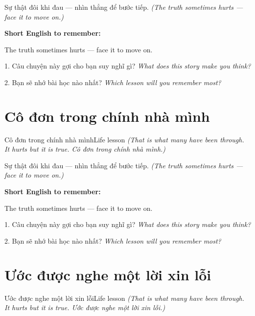 \begin{baihoc}
Sự thật đôi khi đau — nhìn thẳng để bước tiếp.
\textit{(The truth sometimes hurts — face it to move on.)}
\end{baihoc}

\begin{ghinhoanh}
\textbf{Short English to remember:}

The truth sometimes hurts — face it to move on.

\end{ghinhoanh}

\begin{tuhocnhanh}
1. Câu chuyện này gợi cho bạn suy nghĩ gì? \textit{What does this story make you think?}

2. Bạn sẽ nhớ bài học nào nhất? \textit{Which lesson will you remember most?}
\end{tuhocnhanh}
\ngancach


\section{Cô đơn trong chính nhà mình}
\begin{truyen}{Cô đơn trong chính nhà mình}{Life lesson}
\textit{(That is what many have been through. It hurts but it is true. Cô đơn trong chính nhà mình.)}
\end{truyen}

\begin{baihoc}
Sự thật đôi khi đau — nhìn thẳng để bước tiếp.
\textit{(The truth sometimes hurts — face it to move on.)}
\end{baihoc}

\begin{ghinhoanh}
\textbf{Short English to remember:}

The truth sometimes hurts — face it to move on.

\end{ghinhoanh}

\begin{tuhocnhanh}
1. Câu chuyện này gợi cho bạn suy nghĩ gì? \textit{What does this story make you think?}

2. Bạn sẽ nhớ bài học nào nhất? \textit{Which lesson will you remember most?}
\end{tuhocnhanh}
\ngancach


\section{Ước được nghe một lời xin lỗi}
\begin{truyen}{Ước được nghe một lời xin lỗi}{Life lesson}
\textit{(That is what many have been through. It hurts but it is true. Ước được nghe một lời xin lỗi.)}
\end{truyen}

